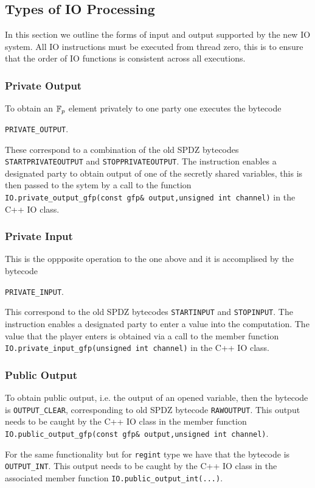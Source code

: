 \subsection{Types of IO Processing}
In this section we outline the forms of input and
output supported by the new IO system.
All IO instructions must be executed from thread zero, this is
to ensure that the order of IO functions is consistent across
all executions.

\subsubsection{Private Output}
To obtain an ${\mathbb{F}}_p$ element privately to one party one
executes the bytecode
\begin{center}
\verb+PRIVATE_OUTPUT+.
\end{center}
These correspond to a combination of the old SPDZ bytecodes
\verb+STARTPRIVATEOUTPUT+ and \verb+STOPPRIVATEOUTPUT+.
The instruction enables a designated party to obtain output of
one of the secretly shared variables, this is then passed
to the sytem by a call to the function
\verb+IO.private_output_gfp(const gfp& output,unsigned int channel)+ in the C++ IO class.

\subsubsection{Private Input}
This is the oppposite operation to the one above and it 
is accomplised by the bytecode
\begin{center}
\verb+PRIVATE_INPUT+.
\end{center}
This correspond to the old SPDZ bytecodes
\verb+STARTINPUT+ and \verb+STOPINPUT+.
The instruction enables a designated party to enter a value into
the computation.
The value that the player enters is obtained via a call to the 
member function
\verb+IO.private_input_gfp(unsigned int channel)+ in the C++ IO class.

\subsubsection{Public Output}
To obtain public output, i.e. the output of an opened variable,
then the bytecode is \verb+OUTPUT_CLEAR+, corresponding to
old SPDZ bytecode \verb+RAWOUTPUT+.
This output needs to be caught by the C++ IO class in
the member function \verb+IO.public_output_gfp(const gfp& output,unsigned int channel)+.

For the same functionality but for \verb|regint| type we have
that the bytecode is \verb+OUTPUT_INT+.
This output needs to be caught by the C++ IO class in
the associated member function 
\verb+IO.public_output_int(...)+.

